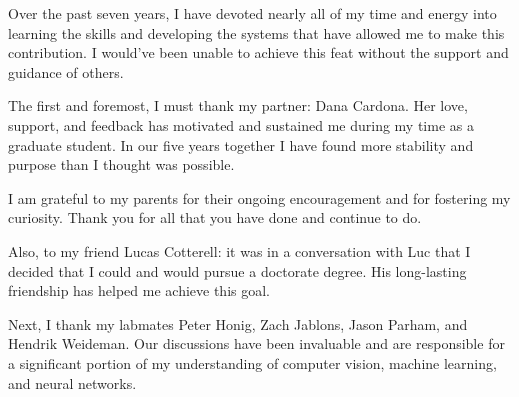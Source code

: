 \documentclass[chap]{thesis}
\author{Jonathan P. Crall
}
\begin{document}
\newcommand{\fnote}[1]{ (#1)}
\ifpublishversion{}
    \newcommand{\devcomment}[1]{}
    \newcommand{\chuckcomment}[1]{}
    \newcommand{\caplbl}[1]{}
\else
    \newcommand{\caplbl}[1]{\red(#1)\black\xspace}
    \newcommand{\devcomment}[1]{\marginpar{\scriptsize{\darkgreen{}\textbf{#1}\black{}}}}
    \newcommand{\chuckcomment}[1]{\marginpar{\scriptsize{\chuckblue{}\textbf{#1}\black{}}}}
\fi




\titlepage{}

\tableofcontents{}        

\listoftables{}          %
\listoffigures{}         %


Over the past seven years, I have devoted nearly all of my time and energy into learning the skills and
  developing the systems that have allowed me to make this contribution.
I would've been unable to achieve this feat without the support and guidance of others.

The first and foremost, I must thank my partner: Dana Cardona.
Her love, support, and feedback has motivated and sustained me during my time as a graduate student.
In our five years together I have found more stability and purpose than I thought was possible.

I am grateful to my parents for their ongoing encouragement and for fostering my curiosity.
Thank you for all that you have done and continue to do.

Also, to my friend Lucas Cotterell:
it was in a conversation with Luc that I decided that I could and would pursue a doctorate degree.
His long-lasting friendship has helped me achieve this goal.

Next, I thank my labmates Peter Honig, Zach Jablons, Jason Parham, and Hendrik Weideman.
Our discussions have been invaluable and are responsible for a significant portion of my understanding of
  computer vision, machine learning, and neural networks.
\end{document}
